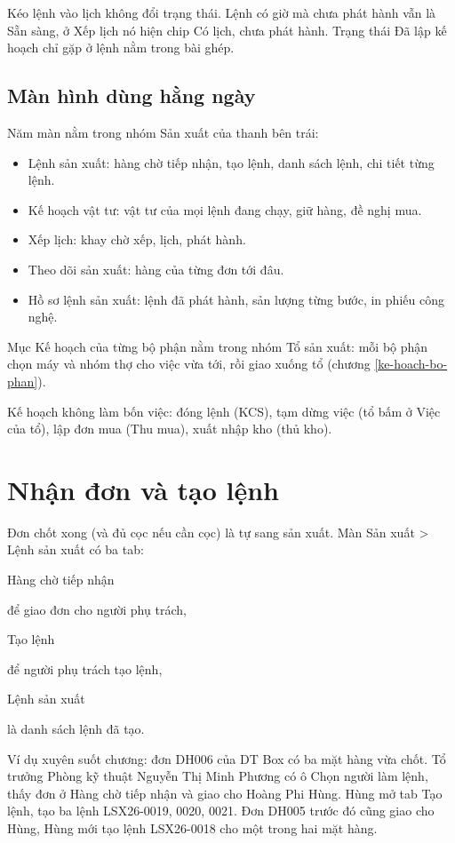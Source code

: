 \documentclass[11pt,a4paper]{article}
\newcommand{\oo}[1]{{\setlength{\fboxsep}{1.2pt}\colorbox{vang}{\strut #1}}}
\newcommand{\duong}[1]{{\tieude\small #1}}
\newcommand{\q}[1]{\textquotedbl#1\textquotedbl{}}
\begin{document}
Kéo lệnh vào lịch không đổi trạng thái. Lệnh có giờ mà chưa phát hành vẫn là Sẵn sàng, ở Xếp lịch nó hiện chip
\q{Có lịch, chưa phát hành}. Trạng thái \q{Đã lập kế hoạch} chỉ gặp ở lệnh nằm trong bài ghép.

\subsection{Màn hình dùng hằng ngày}\label{man-hinh}

Năm màn nằm trong nhóm \duong{Sản xuất} của thanh bên trái:

\begin{itemize}
\item \duong{Lệnh sản xuất}: hàng chờ tiếp nhận, tạo lệnh, danh sách lệnh, chi tiết từng lệnh.
\item \duong{Kế hoạch vật tư}: vật tư của mọi lệnh đang chạy, giữ hàng, đề nghị mua.
\item \duong{Xếp lịch}: khay chờ xếp, lịch, phát hành.
\item \duong{Theo dõi sản xuất}: hàng của từng đơn tới đâu.
\item \duong{Hồ sơ lệnh sản xuất}: lệnh đã phát hành, sản lượng từng bước, in phiếu công nghệ.
\end{itemize}

Mục \duong{Kế hoạch} của từng bộ phận nằm trong nhóm \duong{Tổ sản xuất}: mỗi bộ phận chọn máy và nhóm thợ cho
việc vừa tới, rồi giao xuống tổ (chương \ref{ke-hoach-bo-phan}).

Kế hoạch không làm bốn việc: đóng lệnh (KCS), tạm dừng việc (tổ bấm ở Việc của tổ), lập đơn mua (Thu mua), xuất
nhập kho (thủ kho).

\section{Nhận đơn và tạo lệnh}\label{nhan-don}

Đơn chốt xong (và đủ cọc nếu cần cọc) là tự sang sản xuất. Màn \duong{Sản xuất > Lệnh sản xuất} có ba tab:
\oo{Hàng chờ tiếp nhận} để giao đơn cho người phụ trách, \oo{Tạo lệnh} để người phụ trách tạo lệnh,
\oo{Lệnh sản xuất} là danh sách lệnh đã tạo.

Ví dụ xuyên suốt chương: đơn DH006 của DT Box có ba mặt hàng vừa chốt. Tổ trưởng Phòng kỹ thuật Nguyễn Thị Minh
Phương có ô Chọn người làm lệnh, thấy đơn ở Hàng chờ tiếp nhận và giao cho Hoàng Phi Hùng. Hùng mở tab Tạo lệnh, tạo ba lệnh
LSX26-0019, 0020, 0021. Đơn DH005 trước đó cũng giao cho Hùng, Hùng mới tạo lệnh LSX26-0018 cho một trong hai mặt hàng.
\end{document}
